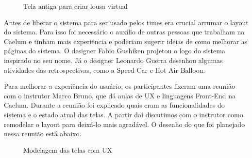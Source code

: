 \begin{figure}[H]
  \centering
  \caption{Tela antiga para criar lousa virtual}\label{figura:criarAntigo}
\end{figure}

Antes de liberar o sistema para ser usado pelos times era crucial arrumar o layout do sistema. Para isso foi necessário o auxílio de outras pessoas que trabalham na Caelum e tinham mais experiência e poderiam sugerir ideias de como melhorar as páginas do sistema. O designer Fabio Gushiken projetou o logo do sistema inspirado no seu nome. Já o designer Leonardo Guerra desenhou algumas atividades das retrospectivas, como a Speed Car e Hot Air Balloon.

Para melhorar a experiência do usuário, os participantes fizeram uma reunião com o instrutor Marco Bruno, que dá aulas de UX e linguagens Front-End na Caelum. Durante a reunião foi explicado quais eram as funcionalidades do sistema e o estado atual das telas. A partir daí discutimos com o instrutor como remodelar o layout para deixá-lo mais agradável. O desenho do que foi planejado nessa reunião está abaixo.

\begin{figure}[H]
  \centering
  \caption{Modelagem das telas com UX}\label{figura:ux}
\end{figure}

